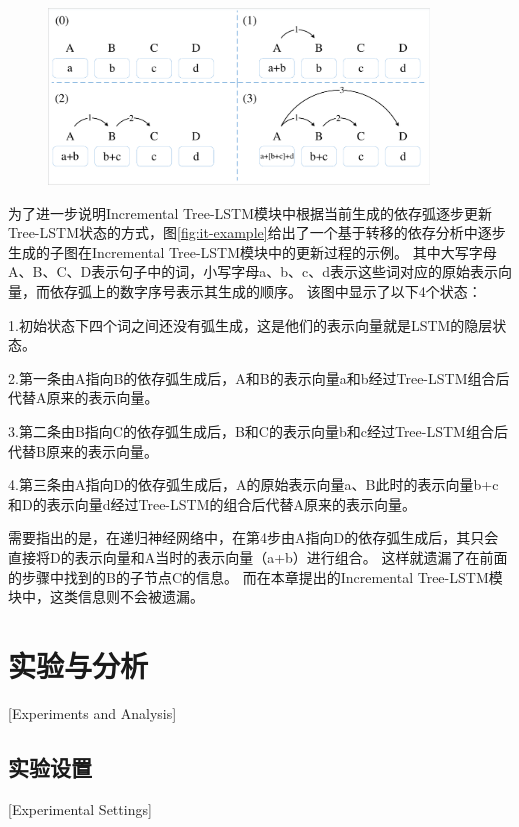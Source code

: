 \begin{figure}[hbtp]
	\centering
	\includegraphics[width=0.9\textwidth]{figures/it-example.pdf}
\end{figure}

为了进一步说明Incremental Tree-LSTM模块中根据当前生成的依存弧逐步更新Tree-LSTM状态的方式，图\ref{fig:it-example}给出了一个基于转移的依存分析中逐步生成的子图在Incremental Tree-LSTM模块中的更新过程的示例。
其中大写字母A、B、C、D表示句子中的词，小写字母a、b、c、d表示这些词对应的原始表示向量，而依存弧上的数字序号表示其生成的顺序。
该图中显示了以下4个状态：

1.初始状态下四个词之间还没有弧生成，这是他们的表示向量就是LSTM的隐层状态。

2.第一条由A指向B的依存弧生成后，A和B的表示向量a和b经过Tree-LSTM组合后代替A原来的表示向量。

3.第二条由B指向C的依存弧生成后，B和C的表示向量b和c经过Tree-LSTM组合后代替B原来的表示向量。

4.第三条由A指向D的依存弧生成后，A的原始表示向量a、B此时的表示向量b+c和D的表示向量d经过Tree-LSTM的组合后代替A原来的表示向量。

需要指出的是，在递归神经网络中，在第4步由A指向D的依存弧生成后，其只会直接将D的表示向量和A当时的表示向量（a+b）进行组合。
这样就遗漏了在前面的步骤中找到的B的子节点C的信息。
而在本章提出的Incremental Tree-LSTM模块中，这类信息则不会被遗漏。

\section{实验与分析}[Experiments and Analysis]

\subsection{实验设置}[Experimental Settings]

